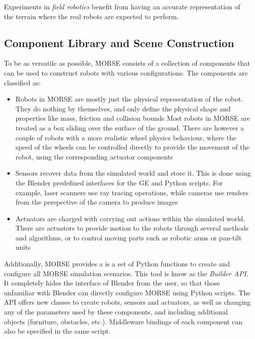 \documentclass{llncs}
\begin{document}
Experiments in \emph{field robotics} benefit from having an accurate
representation of the terrain where the real robots are expected to perform.



\subsection{Component Library and Scene Construction}
\label{section:components}

To be as versatile as possible, MORSE consists of a collection of components
that can be used to construct robots with various configurations. The
components are classified as:

\begin{itemize}
  \item Robots in MORSE are mostly just the physical representation of the
    robot. They do nothing by themselves, and only define the physical shape
    and properties like mass, friction and collision bounds Most robots in
    MORSE are treated as a box sliding over the surface of the ground. There
    are however a couple of robots with a more realistic wheel physics
    behaviour, where the speed of the wheels can be controlled directly to
    provide the movement of the robot, using the corresponding actuator
    components
  \item Sensors recover data from the simulated world and store it. This is
    done using the Blender predefined interfaces for the GE and Python scripts.
    For example, laser scanners use ray tracing operations, while cameras use
    renders from the perspective of the camera to produce images
  \item Actuators are charged with carrying out actions within the simulated
    world. There are actuators to provide motion to the robots through several
    methods and algorithms, or to control moving parts such as robotic arms or
    pan-tilt units
\end{itemize}

Additionally, MORSE provides a is a set of Python functions to create and
configure all MORSE simulation scenarios. This tool is know as the
\emph{Builder API}. It completely hides the interface of Blender from the user,
so that those unfamiliar with Blender can directly configure MORSE using Python
scripts. The API offers new classes to create robots, sensors and actuators, as
well as changing any of the parameters used by these components, and including
additional objects (furniture, obstacles, etc.). Middleware bindings of
each component can also be specified in the same script.
\end{document}
